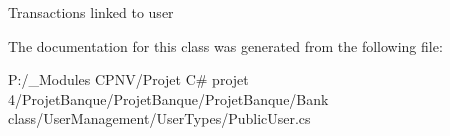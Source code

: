 Transactions linked to user 



The documentation for this class was generated from the following file\+:\begin{DoxyCompactItemize}
\item 
P\+:/\+\_\+\+Modules C\+P\+N\+V/\+Projet C\# projet 4/\+Projet\+Banque/\+Projet\+Banque/\+Projet\+Banque/\+Bank class/\+User\+Management/\+User\+Types/Public\+User.\+cs\end{DoxyCompactItemize}
